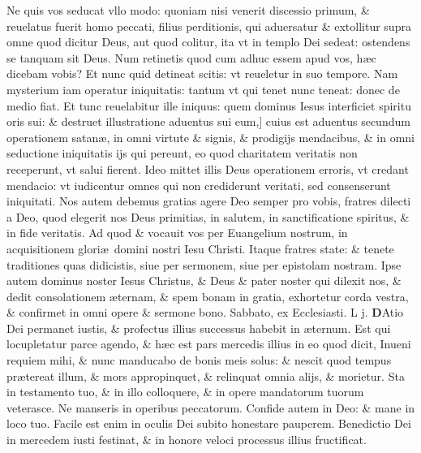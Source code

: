\documentclass[a5paper,10pt]{book}
\def\leftmarginnote{%
	\lrmarginnote{\hskip -\marginparsep \hskip -6.5em}}
\def\rightmarginnote{%
	\lrmarginnote{\hskip\columnwidth \hskip -1em}}
\def\ae{æ}
\begin{document}
\begin{multicols*}{2}
Ne quis vos seducat vllo modo: quoniam nisi venerit discessio primum, \& reuelatus fuerit homo peccati, filius perditionis, qui aduersatur \& extollitur supra omne quod dicitur Deus, aut quod colitur, ita vt in templo Dei sedeat: ostendens se tanquam sit Deus.
Num retinetis quod cum adhuc essem apud vos, h\ae c dicebam vobis? Et nunc quid detineat scitis: vt reueletur in suo tempore.
Nam mysterium iam operatur iniquitatis: tantum vt qui tenet nunc teneat: donec de medio fiat.
Et tunc reuelabitur ille iniquus: quem dominus Iesus interficiet spiritu oris sui: \& destruet illustratione aduentus sui eum,] cuius\leftmarginnote{\begin{flushright}B\end{flushright}} est aduentus secundum operationem satan\ae , in omni virtute \& signis, \& prodigijs mendacibus, \& in omni seductione iniquitatis ijs qui pereunt, eo quod charitatem veritatis non receperunt, vt salui fierent.
Ideo mittet illis Deus operationem erroris, vt credant mendacio: vt iudicentur omnes qui non crediderunt veritati, sed consenserunt iniquitati.
Nos autem debemus gratias agere Deo semper pro vobis, fratres dilecti a Deo,
quod elegerit nos Deus primitias, in salutem, in sanctificatione spiritus, \& in fide veritatis. Ad quod \& vocauit vos per Euangelium nostrum, in acquisitionem glori\ae \ domini nostri Iesu Christi.
Itaque fratres state: \& tenete traditiones quas didicistis, siue per sermonem, siue per epistolam nostram.
Ipse autem dominus noster Iesus Christus, \& Deus \& pater noster qui dilexit nos, \& dedit consolationem \ae ternam, \& spem bonam in gratia, exhortetur corda vestra, \& confirmet in omni opere \& sermone bono.
\newline {} \color{red} \hypertarget{SAT-TERTIA-VAGAN}{Sabbato,} ex Ecclesiasti. \quad L j. \color{black}
\vspace{-1.25em}
\lettrine[lines=2]{\bfseries D}{}Atio\rightmarginnote{c. 11.} Dei permanet iustis, \& profectus illius successus habebit in \ae ternum.
Est qui locupletatur parce agendo, \& h\ae c est pars mercedis illius in eo quod dicit, Inueni requiem mihi, \& nunc manducabo de bonis meis solus: \& nescit quod tempus pr\ae tereat illum, \& mors appropinquet, \& relinquat omnia alijs, \& morietur.
Sta in testamento tuo, \& in illo colloquere, \& in opere mandatorum tuorum veterasce. Ne manseris in operibus peccatorum.
Confide autem in Deo: \& mane in loco tuo. Facile est enim in oculis Dei subito honestare pauperem. Benedictio Dei in mercedem iusti festinat, \& in honore veloci processus illius fructificat.

\end{multicols*}
\end{document}
